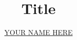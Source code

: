 \documentclass[letterpaper,12pt]{article}
\begin{document}
    \title{\Large{\textbf{Title}}}
    \author{\href{mailto:example@email.com}{YOUR NAME HERE}}
    \date{}
\maketitle
\tableofcontents
\newpage


\end{document}

